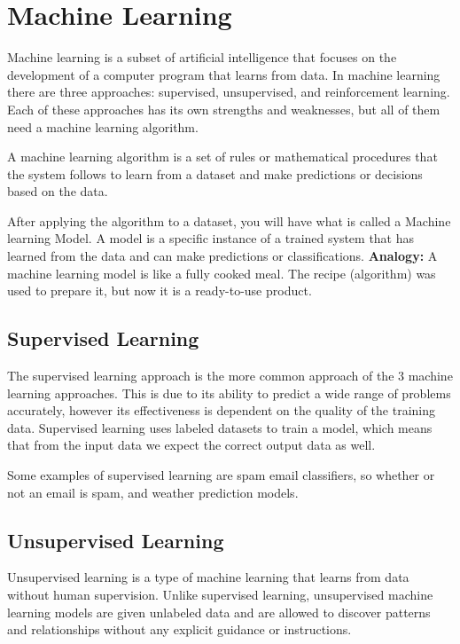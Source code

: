 \section{Machine Learning}
\label{sec:Machine Learning}

Machine learning is a subset of artificial intelligence
that focuses on the development of a computer program that learns from data.
In machine learning there are three approaches: supervised, unsupervised, and reinforcement learning.
Each of these approaches has its own strengths and weaknesses, but all of them need a machine learning algorithm.

A machine learning algorithm is a set of rules or mathematical
procedures that the system follows to learn from a dataset
and make predictions or decisions based on the data.

After applying the algorithm to a dataset, you will have what is called a Machine learning Model.
A model is a specific instance of a trained system that has learned from the data and can make predictions or classifications.
\cite{ML-Models}
\textbf{Analogy:} A machine learning model is like a fully cooked meal.
The recipe (algorithm) was used to prepare it, but now it is a ready-to-use product.

\subsection{Supervised Learning}
The supervised learning approach is the more common approach of the 3 machine learning approaches.
This is due to its ability to predict a wide range of problems accurately,
however its effectiveness is dependent on the quality of the training data.
Supervised learning uses labeled datasets to train a model,
which means that from the input data we expect the correct output data as well.
\cite{GoogleCloud-SL}

Some examples of supervised learning are spam email classifiers,
so whether or not an email is spam, and weather prediction models.

\subsection{Unsupervised Learning}
Unsupervised learning is a type of machine learning that learns from data without human supervision. 
Unlike supervised learning, unsupervised machine learning models are given unlabeled data and are allowed to discover patterns
and relationships without any explicit guidance or instructions. \cite{GoogleCloud-UL}

